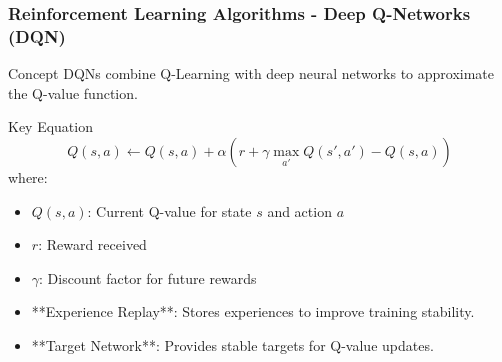 \documentclass[aspectratio=169]{beamer}
\begin{document}
\begin{frame}[fragile]
    \frametitle{Reinforcement Learning Algorithms - Deep Q-Networks (DQN)}
    
    \begin{block}{Concept}
        DQNs combine Q-Learning with deep neural networks to approximate the Q-value function.
    \end{block}
    
    \begin{block}{Key Equation}
        \begin{equation}
        Q(s, a) \leftarrow Q(s, a) + \alpha \left( r + \gamma \max_{a'} Q(s', a') - Q(s, a) \right)
        \end{equation}
        where:
        \begin{itemize}
            \item \( Q(s, a) \): Current Q-value for state \( s \) and action \( a \)
            \item \( r \): Reward received
            \item \( \gamma \): Discount factor for future rewards
        \end{itemize}
    \end{block}

    \begin{itemize}
        \item **Experience Replay**: Stores experiences to improve training stability.
        \item **Target Network**: Provides stable targets for Q-value updates.
    \end{itemize}

\end{frame}
\end{document}
